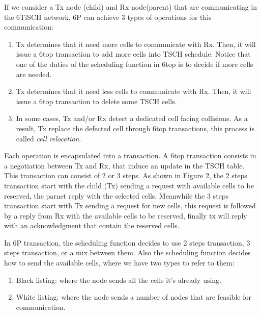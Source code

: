 \documentclass[10pt, conference, compsocconf]{IEEEtran}
\begin{document}
If we consider a Tx node (child) and Rx node(parent) that are communicating in the 6TiSCH network, 6P can achieve 3 types of operations for this communication: 
\begin{enumerate}

\item Tx determines that it need more cells to communicate with Rx. Then, it  will issue a 6top transaction to add more cells into TSCH schedule. Notice that one of  the duties of the scheduling function in 6top is to decide if more cells are needed.

\item Tx determines that it need less cells to communicate with Rx. Then, it will issue a 6top transaction to delete some TSCH cells. 

\item In some cases, Tx and/or Rx detect a dedicated cell facing collisions. As a result, Tx replace the defected cell through 6top transactions, this process is called {\em cell relocation}.
 
\end{enumerate}

Each operation is encapsulated into a transaction. A  6top transaction consists in a negotiation between Tx and Rx, that induce an update in the TSCH table. This transaction can consist of 2 or 3 steps. As shown in Figure 2, the 2 steps transaction start with the child (Tx) sending a request with available cells to be reserved, the parnet reply with the selected cells. Meanwhile the 3 steps transaction start with Tx sending a request for new cells, this request is followed by a reply from Rx with the available cells to be reserved, finally tx will reply with an acknowledgment that contain the reserved cells. 

In 6P transaction, the scheduling function decides to use 2 steps transaction, 3 steps transaction, or a mix between them. Also the scheduling function decides how to send the available cells, where we have two types to refer to them: 
\begin{enumerate}

\item Black listing: where the node sends all the cells it's already using.

\item White listing: where the node sends a number of nodes that are feasible for communication. 



\end{enumerate}
\end{document}
